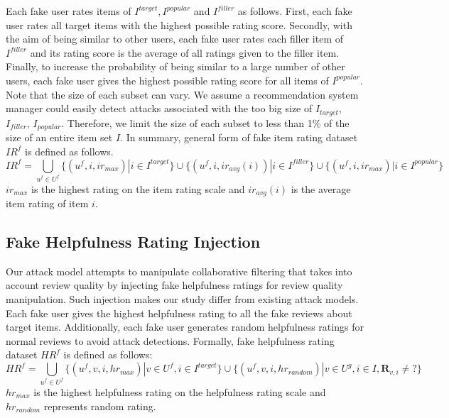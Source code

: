 \documentclass[master,english,final]{kaist-ucs}
\begin{document}
Each fake user rates items of $I^{target},I^{popular}$ and $I^{filler}$ as follows.
First, each fake user rates all target items with the highest possible rating score.
Secondly, with the aim of being similar to other users, each fake user rates each filler item of $I^{filler}$ and its rating score is the average of all ratings given to the filler item.
Finally, to increase the probability of being similar to a large number of other users, each fake user gives the highest possible rating score for all items of $I^{popular}$.
Note that the size of each subset can vary.
We assume a recommendation system manager could easily detect attacks associated with the too big size of $I_{target}$, $I_{filler}$, $I_{popular}$.
Therefore, we limit the size of each subset to less than 1\% of the size of an entire item set $I$.
In summary, general form of fake item rating dataset $IR^f$ is defined as follows.
\begin{equation}
{IR}^f = \bigcup_{u^f \in U^f} \{(u^f,i,ir_{max}) | i \in I^{target} \} \cup \{(u^f,i,ir_{avg} {(i)}) | i \in I^{filler} \} \cup \{(u^f,i,ir_{max}) | i \in I^{popular} \}
\end{equation}
$ir_{max}$ is the highest rating on the item rating scale and $ir_{avg} {(i)}$ is the average item rating of item $i$.

\subsection{Fake Helpfulness Rating Injection}
Our attack model attempts to manipulate collaborative filtering that takes into account review quality by injecting fake helpfulness ratings for review quality manipulation.
Such injection makes our study differ from existing attack models.
Each fake user gives the highest helpfulness rating to all the fake reviews about target items.
Additionally, each fake user generates random helpfulness ratings for normal reviews to avoid attack detections.
Formally, fake helpfulness rating dataset $HR^f$ is defined as follows:
\begin{equation}
HR^f = \bigcup_{u^f \in U^f} \{(u^f,v, i, hr_{max}) | v \in U^f,i \in I^{target} \} \cup \{(u^f,v,i,hr_{random}) | v \in U^g, i \in I, \bm{R}_{v,i} \neq ? \}
\end{equation}
$hr_{max}$ is the highest helpfulness rating on the helpfulness rating scale and $hr_{random}$ represents random rating.
\end{document}
